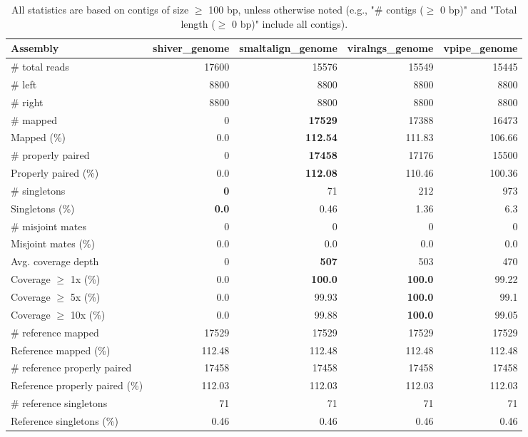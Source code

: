 \documentclass[12pt,a4paper]{article}
\begin{document}
\begin{table}[ht]
\begin{center}
\caption{All statistics are based on contigs of size $\geq$ 100 bp, unless otherwise noted (e.g., "\# contigs ($\geq$ 0 bp)" and "Total length ($\geq$ 0 bp)" include all contigs).}
\begin{tabular}{|l*{4}{|r}|}
\hline
Assembly & shiver\_genome & smaltalign\_genome & viralngs\_genome & vpipe\_genome \\ \hline
\# total reads & 17600 & 15576 & 15549 & 15445 \\ \hline
\# left & 8800 & 8800 & 8800 & 8800 \\ \hline
\# right & 8800 & 8800 & 8800 & 8800 \\ \hline
\# mapped & 0 & {\bf 17529} & 17388 & 16473 \\ \hline
Mapped (\%) & 0.0 & {\bf 112.54} & 111.83 & 106.66 \\ \hline
\# properly paired & 0 & {\bf 17458} & 17176 & 15500 \\ \hline
Properly paired (\%) & 0.0 & {\bf 112.08} & 110.46 & 100.36 \\ \hline
\# singletons & {\bf 0} & 71 & 212 & 973 \\ \hline
Singletons (\%) & {\bf 0.0} & 0.46 & 1.36 & 6.3 \\ \hline
\# misjoint mates & 0 & 0 & 0 & 0 \\ \hline
Misjoint mates (\%) & 0.0 & 0.0 & 0.0 & 0.0 \\ \hline
Avg. coverage depth & 0 & {\bf 507} & 503 & 470 \\ \hline
Coverage $\geq$ 1x (\%) & 0.0 & {\bf 100.0} & {\bf 100.0} & 99.22 \\ \hline
Coverage $\geq$ 5x (\%) & 0.0 & 99.93 & {\bf 100.0} & 99.1 \\ \hline
Coverage $\geq$ 10x (\%) & 0.0 & 99.88 & {\bf 100.0} & 99.05 \\ \hline
\# reference mapped & 17529 & 17529 & 17529 & 17529 \\ \hline
Reference mapped (\%) & 112.48 & 112.48 & 112.48 & 112.48 \\ \hline
\# reference properly paired & 17458 & 17458 & 17458 & 17458 \\ \hline
Reference properly paired (\%) & 112.03 & 112.03 & 112.03 & 112.03 \\ \hline
\# reference singletons & 71 & 71 & 71 & 71 \\ \hline
Reference singletons (\%) & 0.46 & 0.46 & 0.46 & 0.46 \\ \hline

\end{tabular}
\end{center}
\end{table}
\end{document}
